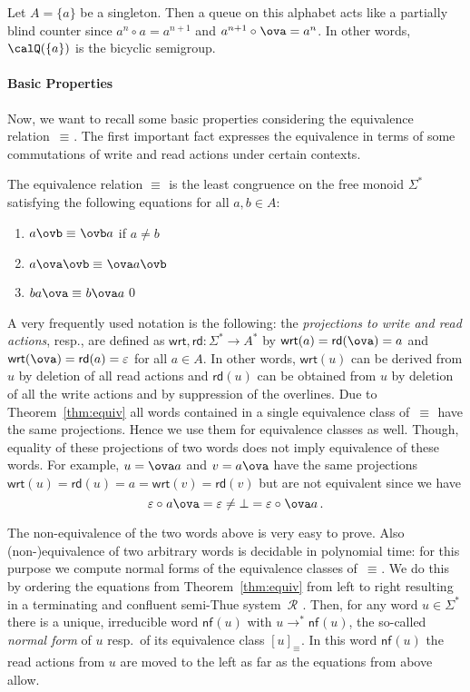 \documentclass[a4paper,numberwithinsect,USenglish]{lipics-v2018}
\theoremstyle{plain}
\theoremstyle{remark}
\newcommand{\classfont}[1]{\mathsf{#1}}
\newcommand{\nf}{\classfont{nf}}
\newcommand{\rd}[1]{\mathsf{rd}(#1)}
\newcommand{\wrt}[1]{\mathsf{wrt}(#1)}
\newcommand{\nfx}[2][]{\nf_{#1}(#2)}
\newcommand{\equivx}[1][]{\equiv_{#1}}
\newcommand{\Qx}{\calQ}
\newcommand{\opx}[1][]{\circ_{#1}}
\newcommand{\Rx}[1][]{\mathcal{R}_{#1}}
\begin{document}
\begin{remark}
	Let $A=\{a\}$ be a singleton. Then a queue on this alphabet acts like a partially blind counter since $a^n\opx a=a^{n+1}$ and $a^{n+1}\opx\ova=a^n$. In other words, $\Qx(\{a\})$ is the bicyclic semigroup.
\end{remark}

\paragraph*{Basic Properties}
Now, we want to recall some basic properties considering the equivalence relation~$\equivx$. The first important fact expresses the equivalence in terms of some commutations of write and read actions under certain contexts.

\begin{theorem}\label{thm:equiv}
	The equivalence relation $\equivx$ is the least congruence on the free monoid $\varSigma^*$ satisfying the following equations for all $a,b\in A$:
	\begin{enumerate}[(1)]
		\item $a\ovb\equivx\ovb a$ if $a\neq b$\label{thm:equiv:i1}
		\item $a\ova\ovb\equivx\ova a\ovb$\label{thm:equiv:i2}
		\item $ba\ova\equivx b\ova a$\label{thm:equiv:i3}\qed
	\end{enumerate}
\end{theorem}

A very frequently used notation is the following: the \emph{projections to write and read actions}, resp., are defined as $\classfont{wrt},\classfont{rd}\colon\varSigma^*\to A^*$ by $\wrt{a}=\rd{\ova}=a$ and $\wrt{\ova}=\rd{a}=\varepsilon$ for all $a\in A$. In other words, $\wrt{u}$ can be derived from $u$ by deletion of all read actions and $\rd{u}$ can be obtained from $u$ by deletion of all the write actions and by suppression of the overlines. Due to Theorem~\ref{thm:equiv} all words contained in a single equivalence class of~$\equivx$ have the same projections. Hence we use them for equivalence classes as well. Though, equality of these projections of two words does not imply equivalence of these words. For example, $u=\ova a$ and $v=a\ova$ have the same projections $\wrt{u}=\rd{u}=a=\wrt{v}=\rd{v}$ but are not equivalent since we have
\[\varepsilon\opx a\ova=\varepsilon\neq\bot=\varepsilon\opx\ova a\,.\]

The non-equivalence of the two words above is very easy to prove. Also (non-)equivalence of two arbitrary words is decidable in polynomial time: for this purpose we compute normal forms of the equivalence classes of~$\equivx$. We do this by ordering the equations from Theorem~\ref{thm:equiv} from left to right resulting in a terminating and confluent semi-Thue system~$\Rx$ \cite[Lemma~4.1]{HusKZ17}. Then, for any word $u\in\varSigma^*$ there is a unique, irreducible word $\nfx{u}$ with $u\to^*\nfx{u}$, the so-called \emph{normal form} of $u$ resp.\ of its equivalence class $[u]_{\equivx}$. In this word $\nfx{u}$ the read actions from $u$ are moved to the left as far as the equations from above allow.
\end{document}
